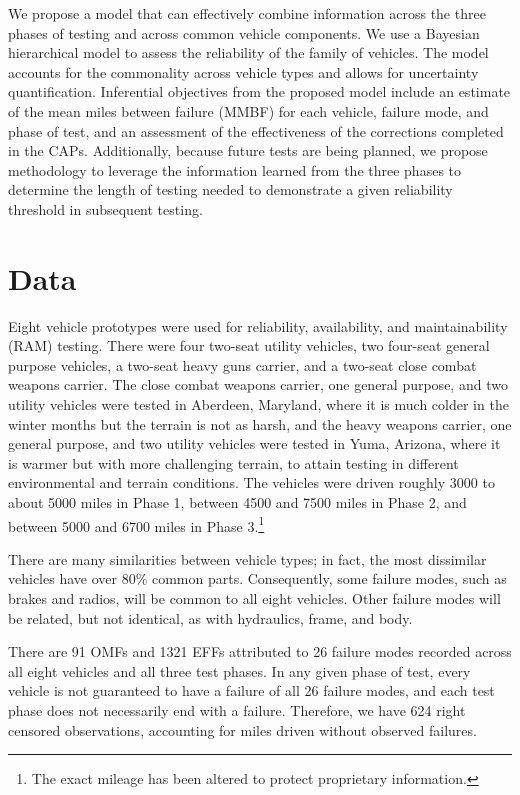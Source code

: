 \documentclass[12pt]{article}
\begin{document}
We propose a model that can effectively combine information across the three phases of testing and across common vehicle components. We use a Bayesian hierarchical model to assess the reliability of the family of vehicles. The model accounts for the commonality across vehicle types and allows for uncertainty quantification. Inferential objectives from the proposed model include an estimate of the mean miles between failure (MMBF) for each vehicle, failure mode, and phase of test, and an assessment of the effectiveness of the corrections completed in the CAPs. Additionally, because future tests are being planned, we propose methodology to leverage the information learned from the three phases to determine the length of testing needed to demonstrate a given reliability threshold in subsequent testing.


\section{Data}
Eight vehicle prototypes were used for reliability, availability, and maintainability (RAM) testing. There were four two-seat utility vehicles, two four-seat general purpose vehicles, a two-seat heavy guns carrier, and a two-seat close combat weapons carrier. The close combat weapons carrier, one general purpose, and two utility vehicles were tested in Aberdeen, Maryland, where it is much colder in the winter months but the terrain is not as harsh, and the heavy weapons carrier, one general purpose, and two utility vehicles were tested in Yuma, Arizona, where it is warmer but with more challenging terrain, to attain testing in different environmental and terrain conditions. The vehicles were driven roughly 3000 to about 5000 miles in Phase 1, between 4500 and 7500 miles in Phase 2, and between 5000 and 6700 miles in Phase 3.\footnote{The exact mileage has been altered to protect proprietary information.}

There are many similarities between vehicle types; in fact, the most dissimilar vehicles have over 80\% common parts. Consequently, some failure modes, such as brakes and radios, will be common to all eight vehicles. Other failure modes will be related, but not identical, as with hydraulics, frame, and body.

There are 91 OMFs and 1321 EFFs attributed to 26 failure modes recorded across all eight vehicles and all three test phases. In any given phase of test, every vehicle is not guaranteed to have a failure of all 26 failure modes, and each test phase does not necessarily end with a failure. Therefore, we have 624 right censored observations, accounting for miles driven without observed failures.
\end{document}
